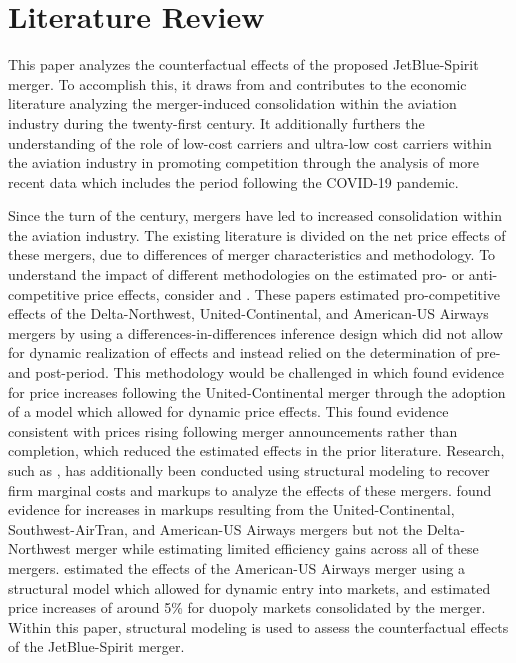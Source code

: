 \documentclass{article}
\begin{document}
    
    \section{Literature Review}
	\label{sec:Literature}

    This paper analyzes the counterfactual effects of the proposed JetBlue-Spirit merger. To accomplish this, it draws from and contributes to the economic literature analyzing the merger-induced consolidation within the aviation industry during the twenty-first century.  It additionally furthers the understanding of the role of low-cost carriers and ultra-low cost carriers within the aviation industry in promoting competition through the analysis of more recent data which includes the period following the COVID-19 pandemic.
	
	Since the turn of the century, mergers have led to increased consolidation within the aviation industry. The existing literature is divided on the net price effects of these mergers, due to differences of merger characteristics and methodology. To understand the impact of different methodologies on the estimated pro- or anti-competitive price effects, consider \citet{luo_price_2014} and \citet{carlton_are_2019}. These papers estimated pro-competitive effects of the Delta-Northwest, United-Continental, and American-US Airways mergers by using a differences-in-differences inference design which did not allow for dynamic realization of effects and instead relied on the determination of pre- and post-period. This methodology would be challenged in \citet{fan_when_2020} which found evidence for price increases following the United-Continental merger through the adoption of a model which allowed for dynamic price effects. This found evidence consistent with prices rising following merger announcements rather than completion, which reduced the estimated effects in the prior literature. Research, such as \citet{bet_retrospective_2021, ciliberto_market_2021}, has additionally been conducted using structural modeling to recover firm marginal costs and markups to analyze the effects of these mergers. \citet{bet_retrospective_2021} found evidence for increases in markups resulting from the United-Continental, Southwest-AirTran, and American-US Airways mergers but not the Delta-Northwest merger while estimating limited efficiency gains across all of these mergers. \citet{ciliberto_market_2021} estimated the effects of the American-US Airways merger using a structural model which allowed for dynamic entry into markets, and estimated price increases of around 5\% for duopoly markets consolidated by the merger. Within this paper, structural modeling is used to assess the counterfactual effects of the JetBlue-Spirit merger. 
\end{document}
